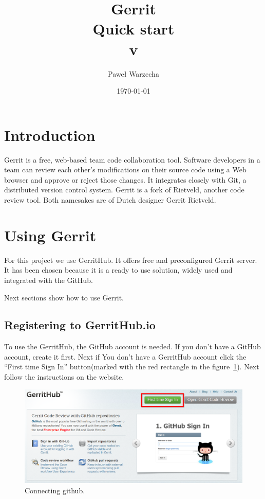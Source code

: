 \documentclass{article}
\title{Gerrit \\ Quick start \\ \small{v\version}}
\author{Paweł Warzecha}
\date{\today}
\begin{document}
\maketitle
\newpage

\tableofcontents
\newpage

\section{Introduction}

Gerrit is a free, web-based team code collaboration tool. Software developers in a team can review each other's modifications on their source code using a Web browser and approve or reject those changes. It integrates closely with Git, a distributed version control system. Gerrit is a fork of Rietveld, another code review tool. Both namesakes are of Dutch designer Gerrit Rietveld.\cite{Gerrit}

\section{Using Gerrit}

For this project we use GerritHub\cite{GerritHub}. It offers free and preconfigured Gerrit server. It has been chosen because it is a ready to use solution, widely used and integrated with the GitHub. 

Next sections show how to use Gerrit.

\subsection{Registering to GerritHub.io}

To use the GerritHub, the GitHub account is needed. If you don't have a GitHub account, create it first. Next if You don't have a GerritHub account click the ``First time Sign In'' button(marked with the red rectangle in the figure~\ref{fig:Register}). Next follow the instructions on the website.

\begin{figure}[!ht]
  \centering
  \includegraphics[width=.75\textwidth]{img/RegisterToGerritHub}
  \caption{Connecting github.}
  \label{fig:Register}
\end{figure}
\end{document}
